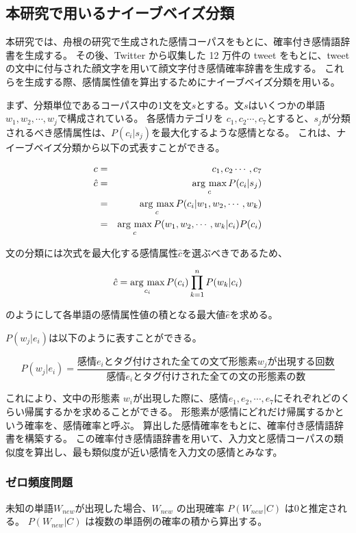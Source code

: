 \documentclass[11pt,a4j]{jsarticle}
\newcommand{\argmax}{\mathop{\rm arg~max}\limits}
\begin{document}
  \subsection{本研究で用いるナイーブベイズ分類}\label{sec:thesisnaivebayes}
本研究では、舟根の研究で生成された感情コーパスをもとに、確率付き感情語辞書を生成する。
その後、Twitter から収集した 12 万件の tweet をもとに、tweet の文中に付与された顔文字を用いて顔文字付き感情確率辞書を生成する。
これらを生成する際、感情属性値を算出するためにナイーブベイズ分類を用いる。

まず、分類単位であるコーパス中の1文を文$s$とする。文$s$はいくつかの単語$w_1,w_2, \cdots ,w_j$で構成されている。
各感情カテゴリを $c_1,c_2 \cdots ,c_7$とすると、$s_j$が分類されるべき感情属性は、$P(c_i|s_j)$を最大化するような感情となる。
これは、ナイーブベイズ分類から以下の式表すことができる。

\begin{eqnarray*}
c & = & {c_1,c_2 \cdots ,c_7}\\
\hat{c} & = & \argmax_{c} P(c_i|s_j) \\
        & = & \argmax_{c} P(c_i|w_1,w_2,\cdots ,w_k) \\
        & = & \argmax_{c} P(w_1,w_2,\cdots ,w_k|c_i)P(c_i) \\
\end{eqnarray*}

文の分類には次式を最大化する感情属性$\hat{c}$を選ぶべきであるため、

\[
\hat{c}=\argmax_{c_i} P(c_i)\prod_{k=1}^n P(w_k|c_i)
\]

のようにして各単語の感情属性値の積となる最大値$\hat{e}$を求める。

$P(w_j|e_i)$は以下のように表すことができる。

\[
P(w_j|e_i)=\frac{感情 e_i とタグ付けされた全ての文で形態素 w_j が出現する回数}{感情 e_i とタグ付けされた全ての文の形態素の数}
\]

これにより、文中の形態素 $w_i$が出現した際に、感情$e_1,e_2, \cdots ,e_7$にそれぞれどのくらい帰属するかを求めることができる。
形態素が感情にどれだけ帰属するかという確率を、感情確率と呼ぶ。
算出した感情確率をもとに、確率付き感情語辞書を構築する。
この確率付き感情語辞書を用いて、入力文と感情コーパスの類似度を算出し、最も類似度が近い感情を入力文の感情とみなす。

\subsubsection{ゼロ頻度問題}\label{sec:zero}
未知の単語$W_\mathit{new}$が出現した場合、$W_\mathit{new}$ の出現確率 $P(W_\mathit{new}|C)$ は0と推定される。
$P(W_\mathit{new}|C)$ は複数の単語例の確率の積から算出する。
\end{document}
